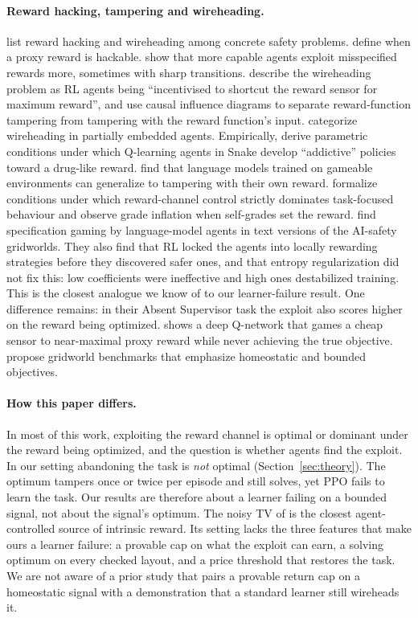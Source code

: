 \documentclass[11pt,letterpaper]{article}
\begin{document}
\paragraph{Reward hacking, tampering and wireheading.}
\citet{amodei2016concrete} list reward hacking and wireheading among concrete safety problems.
\citet{skalse2022defining} define when a proxy reward is hackable. \citet{pan2022effects} show that more capable
agents exploit misspecified rewards more, sometimes with sharp transitions. \citet{everitt2016avoiding} describe the
wireheading problem as RL agents being ``incentivised to shortcut the reward sensor for maximum reward'', and
\citet{everitt2021reward} use causal influence diagrams to separate reward-function tampering from tampering with the
reward function's input. \citet{majha2019categorizing} categorize wireheading in partially embedded agents.
Empirically, \citet{behzadan2018addictive} derive parametric conditions under which Q-learning agents in Snake
develop ``addictive'' policies toward a drug-like reward. \citet{denison2024sycophancy} find that language models
trained on gameable environments can generalize to tampering with their own reward. \citet{africa2025selfevaluation}
formalize conditions under which reward-channel control strictly dominates task-focused behaviour and observe grade
inflation when self-grades set the reward. \citet{cagatan2026reward} find specification gaming by language-model
agents in text versions of the AI-safety gridworlds. They also find that RL locked the agents into locally rewarding
strategies before they discovered safer ones, and that entropy regularization did not fix this: low coefficients were
ineffective and high ones destabilized training. This is the closest analogue we know of to our learner-failure
result. One difference remains: in their Absent Supervisor task the exploit also scores higher on the reward being
optimized. \citet{osei2026specification} shows a deep Q-network that games a cheap sensor to near-maximal proxy reward
while never achieving the true objective. \citet{pihlakas2025homeostasis} propose gridworld benchmarks
that emphasize homeostatic and bounded objectives.

\paragraph{How this paper differs.}
In most of this work, exploiting the reward channel is optimal or dominant under the reward being optimized, and the
question is whether agents find the exploit. In our setting abandoning the task is \emph{not} optimal
(Section~\ref{sec:theory}). The optimum tampers once or twice per episode and still solves, yet PPO fails to learn
the task. Our results are therefore about a learner failing on a bounded signal, not about the signal's optimum. The noisy TV
of \citet{burda2019largescale} is the closest agent-controlled source of intrinsic reward. Its setting lacks the three
features that make ours a learner failure: a provable cap on what the exploit can earn, a solving optimum on every
checked layout, and a price threshold that restores the task. We
are not aware of a prior study that pairs a provable return cap on a homeostatic signal with a demonstration that a
standard learner still wireheads it.
\end{document}
